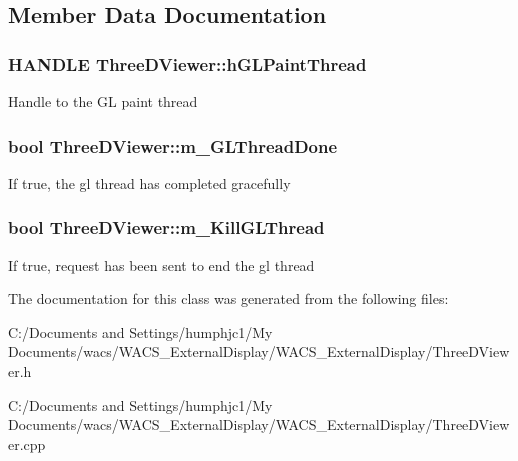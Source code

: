 \subsection{Member Data Documentation}
\hypertarget{class_three_d_viewer_a0c47ff296f00914b1ff504ddea150223}{
\subsubsection[{hGLPaintThread}]{\setlength{\rightskip}{0pt plus 5cm}HANDLE {\bf ThreeDViewer::hGLPaintThread}}}
\label{class_three_d_viewer_a0c47ff296f00914b1ff504ddea150223}
Handle to the GL paint thread \hypertarget{class_three_d_viewer_ae3ba229fd72da44162660aa3d1bd4d02}{
\subsubsection[{m\_\-GLThreadDone}]{\setlength{\rightskip}{0pt plus 5cm}bool {\bf ThreeDViewer::m\_\-GLThreadDone}}}
\label{class_three_d_viewer_ae3ba229fd72da44162660aa3d1bd4d02}
If true, the gl thread has completed gracefully \hypertarget{class_three_d_viewer_a9e2ec7fef411ee9ba4dbbcbf3b2a5527}{
\subsubsection[{m\_\-KillGLThread}]{\setlength{\rightskip}{0pt plus 5cm}bool {\bf ThreeDViewer::m\_\-KillGLThread}}}
\label{class_three_d_viewer_a9e2ec7fef411ee9ba4dbbcbf3b2a5527}
If true, request has been sent to end the gl thread 

The documentation for this class was generated from the following files:\begin{DoxyCompactItemize}
\item 
C:/Documents and Settings/humphjc1/My Documents/wacs/WACS\_\-ExternalDisplay/WACS\_\-ExternalDisplay/ThreeDViewer.h\item 
C:/Documents and Settings/humphjc1/My Documents/wacs/WACS\_\-ExternalDisplay/WACS\_\-ExternalDisplay/ThreeDViewer.cpp\end{DoxyCompactItemize}
